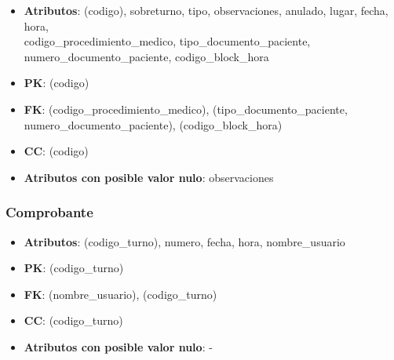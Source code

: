 \documentclass[a4paper,11pt]{article}
\begin{document}
\begin{itemize}

\item 
\textbf{Atributos}: (codigo), sobreturno, tipo, observaciones, anulado, lugar, fecha, hora,  \\ 
codigo\_procedimiento\_medico, 
tipo\_documento\_paciente, numero\_documento\_paciente,
codigo\_block\_hora

\item 
\textbf{PK}: (codigo)

\item
\textbf{FK}: (codigo\_procedimiento\_medico), 
(tipo\_documento\_paciente, numero\_documento\_paciente),
(codigo\_block\_hora)


\item 
\textbf{CC}: (codigo)

\item 
\textbf{Atributos con posible valor nulo}: observaciones

\end{itemize}
\subsubsection{\textbf{Comprobante}}

\begin{itemize}

\item 
\textbf{Atributos}: (codigo\_turno), numero, fecha, hora, nombre\_usuario

\item 
\textbf{PK}: (codigo\_turno)

\item
\textbf{FK}:  (nombre\_usuario), (codigo\_turno)

\item 
\textbf{CC}: (codigo\_turno)

\item 
\textbf{Atributos con posible valor nulo}: -

\end{itemize}
\end{document}

